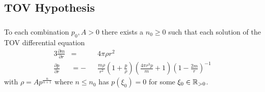 \subsection{TOV Hypothesis}
\begin{frame}
	\frametitle{\insertsubsection}
	\begin{hypothesis}
		To each combination $p_0,A>0$ there exists a $n_0\geq0$ such that each solution of the TOV differential equation
		\begin{alignat*}{3}
			\frac{\partial m}{\partial r} &= &&4\pi\rho r^2\\
			\frac{\partial p}{\partial r} &= -&&\frac{m\rho}{r^2}\left(1+\frac{p}{\rho}\right)\left(\frac{4\pi r^3p}{m}+1\right)\left(1-\frac{2m}{r}\right)^{-1}
		\end{alignat*}
		with $\rho=Ap^{\frac{n}{n+1}}$ where $n\leq n_0$ has $p(\xi_0)=0$ for some $\xi_0\in\mathbb{R}_{>0}$.
	\end{hypothesis}
\end{frame}


% 		
